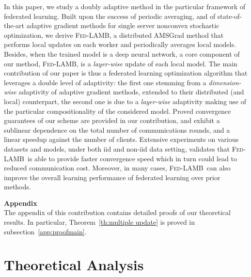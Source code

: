 \documentclass[11pt]{article}
\newcommand{\algo}{\textsc{Fed-LAMB}}
\begin{document}
In this paper, we study a doubly adaptive method in the particular framework of federated learning.
Built upon the success of periodic averaging, and of state-of-the-art adaptive gradient methods for single server nonconvex stochastic optimization, we derive \algo, a distributed AMSGrad method that performs local updates on each worker and periodically averages local models. 
Besides, when the trained model is a deep neural network, a core component of our method, \algo, is a \emph{layer-wise} update of each local model.
The main contribution of our paper is thus a federated learning optimization algorithm that leverages a double level of adaptivity: the first one stemming from a \emph{dimension-wise} adaptivity of adaptive gradient methods, extended to their distributed (and local) counterpart, the second one is due to a  \emph{layer-wise} adaptivity making use of the particular compositionality of the considered model.
Proved convergence guarantees of our scheme are provided in our contribution, and exhibit a sublinear dependence on the total number of communications rounds, and a linear speedup against the number of clients. Extensive experiments on various datasets and models, under both iid and non-iid data setting, validates that \algo\ is able to provide faster convergence speed which in turn could lead to reduced communication cost. Moreover, in many cases, \algo\ can also improve the overall learning performance of federated learning over prior methods.


\newpage
\appendix


\noindent\textbf{\LARGE Appendix}\\
 
 
The appendix of this contribution contains detailed proofs of our theoretical results.
In particular, Theorem~\ref{th:multiple update} is proved in subsection~\ref{app:proofmain}.



\section{Theoretical Analysis}\label{app:proofs}
\end{document}
